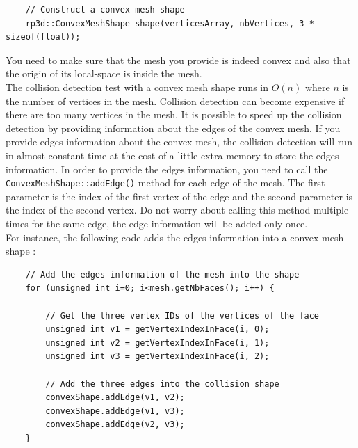 \documentclass[a4paper,12pt]{article}
\begin{document}
    \begin{lstlisting}
    // Construct a convex mesh shape
    rp3d::ConvexMeshShape shape(verticesArray, nbVertices, 3 * sizeof(float));
  \end{lstlisting}

    \vspace{0.6cm}

    You need to make sure that the mesh you provide is indeed convex and also that the origin of its local-space is inside the mesh. \\

    The collision detection test with a convex mesh shape runs in $O(n)$ where $n$ is the number of vertices in the mesh. Collision detection can become expensive if there are
    too many vertices in the mesh. It is possible to speed up the collision detection by providing information about the edges of the convex mesh. If you provide edges information
    about the convex mesh, the collision detection will run in almost constant time at the cost of a little extra memory to store the edges information. In order to provide the edges
    information, you need to call the \texttt{ConvexMeshShape::addEdge()} method for each edge of the mesh. The first parameter is the index of the first vertex of the edge and the
    second parameter is the index of the second vertex. Do not worry about calling this method multiple times for the same edge, the edge information will be added only
    once. \\

    For instance, the following code adds the edges information into a convex mesh shape : \\

    \begin{lstlisting}
    // Add the edges information of the mesh into the shape
    for (unsigned int i=0; i<mesh.getNbFaces(); i++) {

        // Get the three vertex IDs of the vertices of the face
        unsigned int v1 = getVertexIndexInFace(i, 0);
        unsigned int v2 = getVertexIndexInFace(i, 1);
        unsigned int v3 = getVertexIndexInFace(i, 2);

        // Add the three edges into the collision shape
        convexShape.addEdge(v1, v2);
        convexShape.addEdge(v1, v3);
        convexShape.addEdge(v2, v3);
    }
  \end{lstlisting}

    \vspace{0.6cm}
\end{document}
